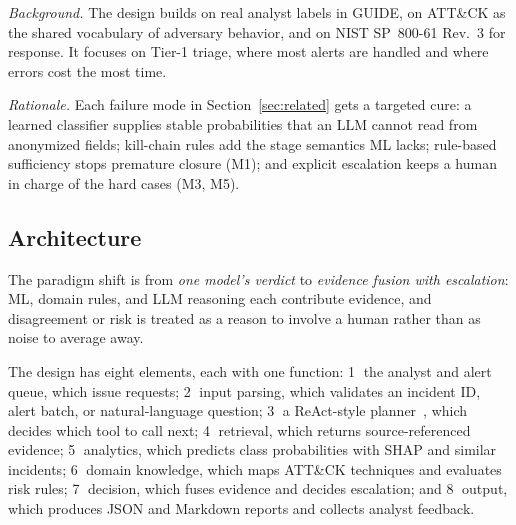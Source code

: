 \documentclass[conference]{IEEEtran}
\begin{document}
\emph{Background.} The design builds on real analyst labels in GUIDE,
on ATT\&CK as the shared vocabulary of adversary behavior, and on
NIST SP~800-61 Rev.~3 for response. It focuses on Tier-1 triage, where
most alerts are handled and where errors cost the most time.

\emph{Rationale.} Each failure mode in Section~\ref{sec:related} gets a
targeted cure: a learned classifier supplies stable probabilities that
an LLM cannot read from anonymized fields; kill-chain rules add the
stage semantics ML lacks; rule-based sufficiency stops premature
closure (M1); and explicit escalation keeps a human in charge of the
hard cases (M3, M5).

\subsection{Architecture}
The paradigm shift is from \emph{one model's verdict} to \emph{evidence
fusion with escalation}: ML, domain rules, and LLM reasoning each
contribute evidence, and disagreement or risk is treated as a reason to
involve a human rather than as noise to average away.

The design has eight elements, each with one function:
\textcircled{1} the analyst and alert queue, which issue requests;
\textcircled{2} input parsing, which validates an incident ID, alert
batch, or natural-language question;
\textcircled{3} a ReAct-style planner~\cite{yao2023react}, which decides
which tool to call next;
\textcircled{4} retrieval, which returns source-referenced evidence;
\textcircled{5} analytics, which predicts class probabilities with SHAP
and similar incidents;
\textcircled{6} domain knowledge, which maps ATT\&CK techniques and
evaluates risk rules;
\textcircled{7} decision, which fuses evidence and decides escalation;
and \textcircled{8} output, which produces JSON and Markdown reports and
collects analyst feedback.
\end{document}
